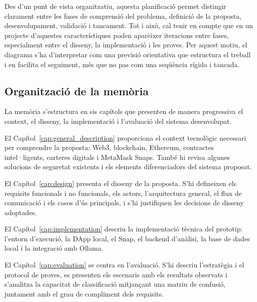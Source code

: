 \newpage

Des d’un punt de vista organitzatiu, aquesta planificació permet distingir clarament entre les fases de comprensió del problema, definició de la proposta, desenvolupament, validació i tancament. Tot i això, cal tenir en compte que en un projecte d’aquestes característiques poden aparèixer iteracions entre fases, especialment entre el disseny, la implementació i les proves. Per aquest motiu, el diagrama s’ha d’interpretar com una previsió orientativa que estructura el treball i en facilita el seguiment, més que no pas com una seqüència rígida i tancada.

 



\subsection{Organització de la memòria}

La memòria s’estructura en sis capítols que presenten de manera progressiva el context, el disseny, la implementació i l’avaluació del sistema desenvolupat.

El Capítol~\ref{cap:general_description} proporciona el context tecnològic necessari per comprendre la proposta: Web3, blockchain, Ethereum, contractes intel·ligents, carteres digitals i MetaMask Snaps. També hi revisa algunes solucions de seguretat existents i els elements diferenciadors del sistema proposat.

El Capítol~\ref{cap:design} presenta el disseny de la proposta. S’hi defineixen els requisits funcionals i no funcionals, els actors, l’arquitectura general, el flux de comunicació i els casos d’ús principals, i s’hi justifiquen les decisions de disseny adoptades.

El Capítol~\ref{cap:implementation} descriu la implementació tècnica del prototip: l’entorn d’execució, la DApp local, el Snap, el backend d’anàlisi, la base de dades local i la integració amb Ollama.

El Capítol~\ref{cap:evaluation} se centra en l’avaluació. S’hi descriu l’estratègia i el protocol de proves, es presenten els escenaris amb els resultats observats i s’analitza la capacitat de classificació mitjançant una matriu de confusió, juntament amb el grau de compliment dels requisits.

